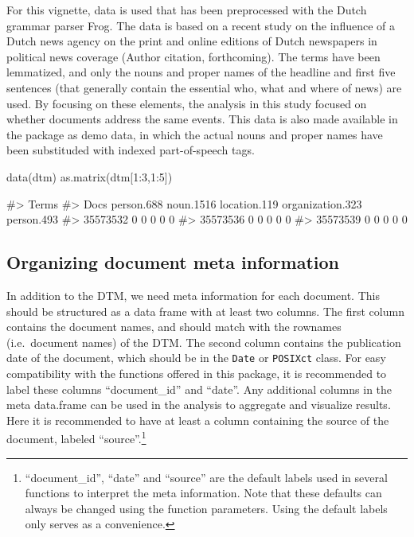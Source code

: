For this vignette, data is used that has been preprocessed with the
Dutch grammar parser Frog. The data is based on a recent study on the
influence of a Dutch news agency on the print and online editions of
Dutch newspapers in political news coverage (Author citation,
forthcoming). The terms have been lemmatized, and only the nouns and
proper names of the headline and first five sentences (that generally
contain the essential who, what and where of news) are used. By focusing
on these elements, the analysis in this study focused on whether
documents address the same events. This data is also made available in
the package as demo data, in which the actual nouns and proper names
have been substituded with indexed part-of-speech tags.

\begin{Schunk}
\begin{Sinput}
data(dtm)
as.matrix(dtm[1:3,1:5])
\end{Sinput}
\begin{Soutput}
#>           Terms
#> Docs       person.688 noun.1516 location.119 organization.323 person.493
#>   35573532          0         0            0                0          0
#>   35573536          0         0            0                0          0
#>   35573539          0         0            0                0          0
\end{Soutput}
\end{Schunk}

\subsection{Organizing document meta
information}\label{organizing-document-meta-information}

In addition to the DTM, we need meta information for each document. This
should be structured as a data frame with at least two columns. The
first column contains the document names, and should match with the
rownames (i.e.~document names) of the DTM. The second column contains
the publication date of the document, which should be in the
\texttt{Date} or \texttt{POSIXct} class. For easy compatibility with the
functions offered in this package, it is recommended to label these
columns ``document\_id'' and ``date''. Any additional columns in the
meta data.frame can be used in the analysis to aggregate and visualize
results. Here it is recommended to have at least a column containing the
source of the document, labeled ``source''.\footnote{``document\_id'',
  ``date'' and ``source'' are the default labels used in several
  functions to interpret the meta information. Note that these defaults
  can always be changed using the function parameters. Using the default
  labels only serves as a convenience.}

